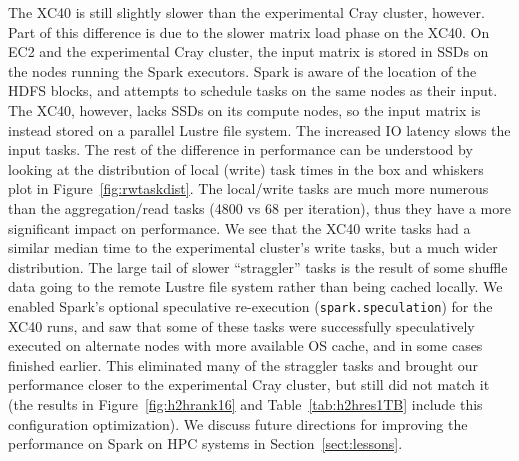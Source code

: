 The XC40 is still slightly slower than the experimental Cray cluster, however.
Part of this difference is due to the slower matrix load phase on the XC40.  On
EC2 and the experimental Cray cluster, the input matrix is stored in SSDs on
the nodes running the Spark executors.  Spark is aware of the location of the
HDFS blocks, and attempts to schedule tasks on the same nodes as their input.
The XC40, however, lacks SSDs on its compute nodes, so the input matrix is
instead stored on a parallel Lustre file system.  The increased IO latency
slows the input tasks. The rest of the difference in performance can be
understood by looking at the distribution of local (write) task times in the
box and whiskers plot in Figure~\ref{fig:rwtaskdist}.  The local/write tasks
are much more numerous than the aggregation/read tasks (4800 vs 68 per
iteration), thus they have a more significant impact on performance.  We see
that the XC40 write tasks had a similar median time to the experimental
cluster's write tasks, but a much wider distribution.  The large tail of slower
``straggler'' tasks is the result of some shuffle data going to the remote Lustre
file system rather than being cached locally. We enabled Spark's optional
speculative re-execution (\texttt{spark.speculation}) for the XC40 runs, and
saw that some of these tasks were successfully speculatively executed on
alternate nodes with more available OS cache, and in some cases finished
earlier.  This eliminated many of the straggler tasks and brought our
performance closer to the experimental Cray cluster, but still did not match it
(the results in Figure~\ref{fig:h2hrank16} and Table~\ref{tab:h2hres1TB}
include this configuration optimization).  We discuss future directions for
improving the performance on Spark on HPC systems in
Section~\ref{sect:lessons}.
